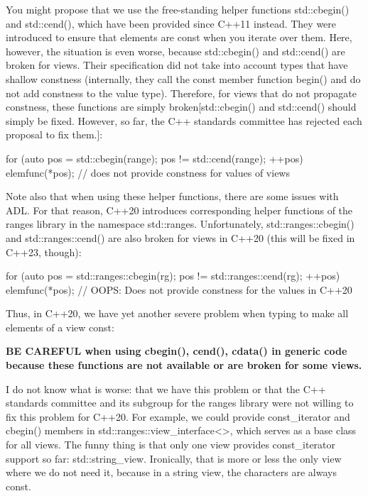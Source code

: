 You might propose that we use the free-standing helper functions std::cbegin() and std::cend(), which have been provided since C++11 instead. They were introduced to ensure that elements are const when you iterate over them. Here, however, the situation is even worse, because std::cbegin() and std::cend() are broken for views. Their specification did not take into account types that have shallow constness (internally, they call the const member function begin() and do not add constness to the value type). Therefore, for views that do not propagate constness, these functions are simply broken[std::cbegin() and std::cend() should simply be fixed. However, so far, the C++ standards committee has rejected each proposal to fix them.]:

\begin{cpp}
for (auto pos = std::cbegin(range); pos != std::cend(range); ++pos) {
	elemfunc(*pos); // does not provide constness for values of views
}
\end{cpp}

Note also that when using these helper functions, there are some issues with ADL. For that reason, C++20 introduces corresponding helper functions of the ranges library in the namespace std::ranges. Unfortunately, std::ranges::cbegin() and std::ranges::cend() are also broken for views in C++20 (this will be fixed in C++23, though):

\begin{cpp}
for (auto pos = std::ranges::cbegin(rg); pos != std::ranges::cend(rg); ++pos) {
	elemfunc(*pos); // OOPS: Does not provide constness for the values in C++20
}
\end{cpp}

Thus, in C++20, we have yet another severe problem when typing to make all elements of a view const:

\textbf{BE CAREFUL when using cbegin(), cend(), cdata() in generic code because these functions are not available or are broken for some views.}

I do not know what is worse: that we have this problem or that the C++ standards committee and its subgroup for the ranges library were not willing to fix this problem for C++20. For example, we could provide const\_iterator and cbegin() members in std::ranges::view\_interface<>, which serves as a base class for all views. The funny thing is that only one view provides const\_iterator support so far: std::string\_view. Ironically, that is more or less the only view where we do not need it, because in a string view, the characters are always const.

